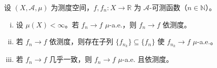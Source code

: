 \documentclass[../../main.tex]{subfiles}%
\begin{document}
\begin{proposition}\label{proposition:ch02-收敛关系}
设 $(X,\mathscr A,\mu)$ 为测度空间，$f,f_n:X\to\mathbb{R}$ 为 $\mathscr A$-可测函数（$n\in\mathbb{N}$）。
\begin{enumerate}[(i)]
\item 设 $\mu(X)<\infty$。若 $f_n\to f$ $\mu$-a.e.，则 $f_n\to f$ 依测度。
\item 若 $f_n\to f$ 依测度，则存在子列 $\{f_{n_k}\}\subseteq\{f_n\}$ 使 $f_{n_k}\to f$ $\mu$-a.e.。
\item 若 $f_n\to f$ 几乎一致，则 $f_n\to f$ $\mu$-a.e. 且依测度。
\end{enumerate}
\end{proposition}

\end{document}
